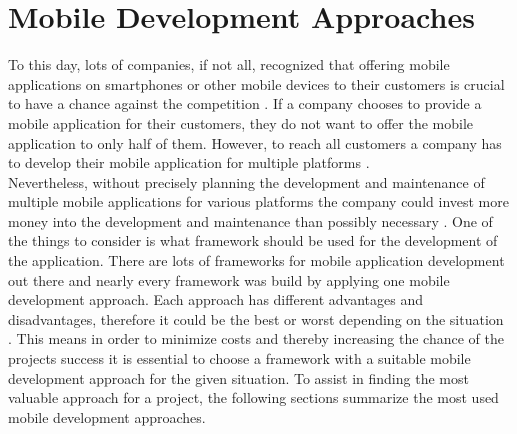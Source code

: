 \documentclass[Bachelor,BIF,english]{twbook}
\begin{document}
\newpage
\chapter{Mobile Development Approaches}
To this day, lots of companies, if not all, recognized that offering mobile applications on smartphones or other mobile devices to their customers is crucial to have a chance against the competition \cite{7479278}. If a company chooses to provide a mobile application for their customers, they do not want to offer the mobile application to only half of them. However, to reach all customers a company has to develop their mobile application for multiple platforms \cite[p.~5]{Steczko2016}.
\\[\baselineskip]
Nevertheless, without precisely planning the development and maintenance of multiple mobile applications for various platforms the company could invest more money into the development and maintenance than possibly necessary \cite[p.~1]{JohanssonSderberg2018} \cite[p.~8]{Steczko2016} \cite[p.~757]{Ciman2014}. One of the things to consider is what framework should be used for the development of the application. There are lots of frameworks for mobile application development out there and nearly every framework was build by applying one mobile development approach. Each approach has different advantages and disadvantages, therefore it could be the best or worst depending on the situation \cite{6420693} \cite{7934674}. This means in order to minimize costs and thereby increasing the chance of the projects success it is essential to choose a framework with a suitable mobile development approach for the given situation. To assist in finding the most valuable approach for a project, the following sections summarize the most used mobile development approaches. 
\end{document}
